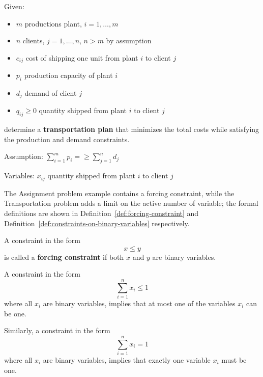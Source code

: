 \documentclass[english]{article}
\begin{document}
\begin{example}
  \label{ex:transportation-problem}
  Given:
  \begin{itemize}
    \item \(m\) productions plant, \(i = 1, \dots, m\)
    \item \(n\) clients, \(j = 1, \dots, n\), \(n > m\) by assumption
    \item \(c_{ij}\) cost of shipping one unit from plant \(i\) to client \(j\)
    \item \(p_i\) production capacity of plant \(i\)
    \item \(d_j\) demand of client \(j\)
    \item \(q_{ij} \geq 0\) quantity shipped from plant \(i\) to client \(j\)
  \end{itemize}
  determine a \textbf{transportation plan} that minimizes the total costs while satisfying the production and demand constraints.

  Assumption: \(\displaystyle \sum_{i=1}^m p_i = \geq \sum_{j=1}^{n} d_j\)

  Variables: \(x_{ij}\) quantity shipped from plant \(i\) to client \(j\)

\end{example}

The Assignment problem example contains a forcing constraint, while the Transportation problem adds a limit on the active number of variable;
the formal definitions are shown in Definition~\ref{def:forcing-constraint} and Definition~\ref{def:constraints-on-binary-variables} respectively.

\begin{definition}
  \label{def:forcing-constraint}
  A constraint in the form
  \[ \displaystyle x \leq y\]
  is called a \textbf{forcing constraint} if both \(x\) and \(y\) are binary variables.
\end{definition}

\begin{definition}
  \label{def:constraints-on-binary-variables}
  A constraint in the form
  \[ \displaystyle \sum_{i=1}^n x_i \leq 1 \]
  where all \(x_i\) are binary variables, implies that at most one of the variables \(x_i\) can be one.

  Similarly, a constraint in the form
  \[ \displaystyle \sum_{i=1}^n x_i = 1 \]
  where all \(x_i\) are binary variables, implies that exactly one variable \(x_i\) must be one.
\end{definition}
\end{document}
